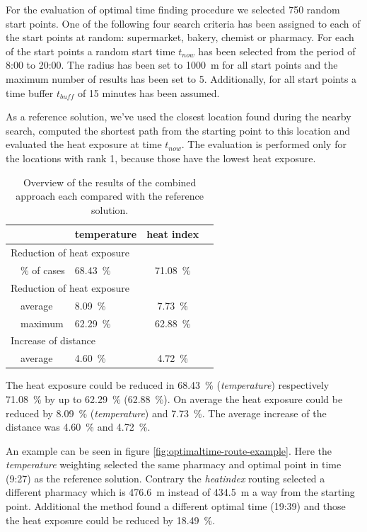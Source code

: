 For the evaluation of optimal time finding procedure we selected 750 random start points. One of the following four search criteria has been assigned to each of the start points at random: supermarket, bakery, chemist or pharmacy. For each of the start points a random start time $t_{now}$ has been selected from the period of 8:00 to 20:00. The radius has been set to \SI{1000}{\meter} for all start points and the maximum number of results has been set to 5. Additionally, for all start points a time buffer $t_{buff}$ of 15 minutes has been assumed. 

As a reference solution, we've used the closest location found during the nearby search, computed the shortest path from the starting point to this location and evaluated the heat exposure at time $t_{now}$. The evaluation is performed only for the locations with rank 1, because those have the lowest heat exposure.

\begin{table}
	\centering
	\begin{tabular}{lp{8cm}lcc}
		\hline
		& & temperature & heat index \\
		\hline
		\multicolumn{4}{l}{Reduction of heat exposure}   \\
		& \% of cases  & \SI{68.43}{\percent} & \SI{71.08}{\percent}  \\
		\multicolumn{4}{l}{Reduction of heat exposure}  \\
		& average  & \SI{8.09}{\percent} & \SI{7.73}{\percent}  \\
		& maximum  & \SI{62.29}{\percent} & \SI{62.88}{\percent}  \\
		\multicolumn{4}{l}{Increase of distance}  \\
		& average  & \SI{4.60}{\percent}  & \SI{4.72}{\percent}  \\
		\hline
	\end{tabular}
	\caption{Overview of the results of the combined approach each compared with the reference solution.  \label{tab:results-optima-time}}
\end{table}


The heat exposure could be reduced in \SI{68.43}{\percent} (\emph{temperature}) respectively \SI{71.08}{\percent} by up to \SI{62.29}{\percent} (\SI{62.88}{\percent}). On average the heat exposure could be reduced by \SI{8.09}{\percent} (\emph{temperature}) and \SI{7.73}{\percent}. The average increase of the distance was \SI{4.60}{\percent} and \SI{4.72}{\percent}.

An example can be seen in figure \ref{fig:optimaltime-route-example}. 
Here the \emph{temperature} weighting selected the same pharmacy and optimal point in time (9:27) as the reference solution. Contrary the \emph{heatindex} routing selected a different pharmacy which is \SI{476.6}{\meter} instead of  \SI{434.5}{\meter} a way from the starting point. Additional the method found a different optimal time (19:39) and those the heat exposure could be reduced by \SI{18.49}{\percent}.  
 
